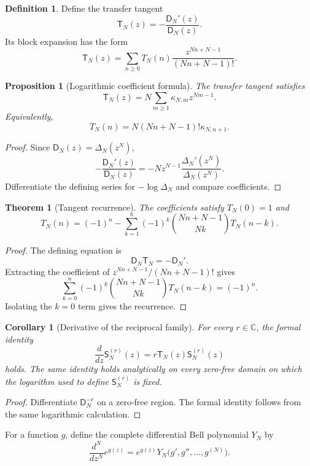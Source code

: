 \documentclass[11pt]{article}
\newtheorem{theorem}{Theorem}[section]
\newtheorem{proposition}[proposition]{Proposition}
\newtheorem{corollary}[corollary]{Corollary}
\theoremstyle{definition}
\newtheorem{definition}[definition]{Definition}
\theoremstyle{remark}
\newcommand{\CC}{\mathbb C}
\newcommand{\Dfun}{\mathsf D}
\newcommand{\Sfun}{\mathsf S}
\newcommand{\Tfun}{\mathsf T}
\begin{document}
\begin{definition}\label{def:transfer_tangent}
Define the transfer tangent
\[
\Tfun_N(z)
=-\frac{\Dfun_N'(z)}{\Dfun_N(z)}.
\]
Its block expansion has the form
\[
\Tfun_N(z)
=
\sum_{n\geq0}T_N(n)
\frac{z^{Nn+N-1}}{(Nn+N-1)!}.
\]
\end{definition}

\begin{proposition}[Logarithmic coefficient formula]\label{prop:tangent_kappa}
The transfer tangent satisfies
\[
\Tfun_N(z)
=
N\sum_{m\geq1}\kappa_{N,m}z^{Nm-1}.
\]
Equivalently,
\[
T_N(n)
=
N(Nn+N-1)!\kappa_{N,n+1}.
\]
\end{proposition}

\begin{proof}
Since $\Dfun_N(z)=\Delta_N(z^N)$,
\[
-\frac{\Dfun_N'(z)}{\Dfun_N(z)}
=
-Nz^{N-1}\frac{\Delta_N'(z^N)}{\Delta_N(z^N)}.
\]
Differentiate the defining series for $-\log\Delta_N$ and compare coefficients.
\end{proof}

\begin{theorem}[Tangent recurrence]\label{thm:tangent_recurrence}
The coefficients satisfy $T_N(0)=1$ and
\[
T_N(n)
=
(-1)^n
-
\sum_{k=1}^{n}
(-1)^k
\binom{Nn+N-1}{Nk}
T_N(n-k).
\]
\end{theorem}

\begin{proof}
The defining equation is
\[
\Dfun_N\Tfun_N=-\Dfun_N'.
\]
Extracting the coefficient of $z^{Nn+N-1}/(Nn+N-1)!$ gives
\[
\sum_{k=0}^{n}(-1)^k
\binom{Nn+N-1}{Nk}T_N(n-k)=(-1)^n.
\]
Isolating the $k=0$ term gives the recurrence.
\end{proof}

\begin{corollary}[Derivative of the reciprocal family]\label{cor:reciprocal_derivative}
For every $r\in\CC$, the formal identity
\[
\frac{d}{dz}\Sfun_N^{(r)}(z)
=
r\Tfun_N(z)\Sfun_N^{(r)}(z)
\]
holds.  The same identity holds analytically on every zero-free
domain on which the logarithm used to define $\Sfun_N^{(r)}$ is fixed.
\end{corollary}

\begin{proof}
Differentiate $\Dfun_N^{-r}$ on a zero-free region.  The formal identity follows from the same logarithmic calculation.
\end{proof}

For a function $g$, define the complete differential Bell polynomial $Y_N$ by
\[
\frac{d^N}{dz^N}e^{g(z)}
=
e^{g(z)}Y_N\bigl(g',g'',\ldots,g^{(N)}\bigr).
\]
\end{document}
